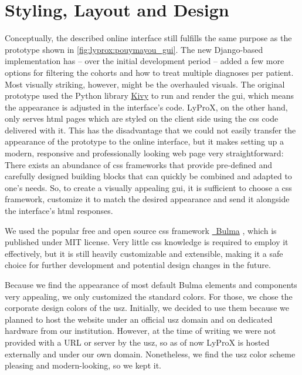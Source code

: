 \documentclass[\relativeRoot/main.tex]{subfiles}
\begin{document}
\section{Styling, Layout and Design}
\label{sec:lyprox:design}

Conceptually, the described online interface still fulfills the same purpose as the prototype shown in \cref{fig:lyprox:pouymayou_gui}. The new Django-based implementation has -- over the initial development period -- added a few more options for filtering the cohorts and how to treat multiple diagnoses per patient. Most visually striking, however, might be the overhauled visuals. The original prototype used the Python library \href{https://kivy.org}{Kivy} to run and render the \gls{gui}, which means the appearance is adjusted in the interface's code. LyProX, on the other hand, only serves \acrshort{html} pages which are styled on the client side using the \acrshort{css} code delivered with it. This has the disadvantage that we could not easily transfer the appearance of the prototype to the online interface, but it makes setting up a modern, responsive and professionally looking web page very straightforward: There exists an abundance of \acrshort{css} frameworks that provide pre-defined and carefully designed building blocks that can quickly be combined and adapted to one's needs. So, to create a visually appealing \gls{gui}, it is sufficient to choose a \acrshort{css} framework, customize it to match the desired appearance and send it alongside the interface's \acrshort{html} responses.

We used the popular free and open source \acrshort{css} framework \href{https://bulma.io}{~Bulma} \cite{thomas_bulma_2021}, which is published under MIT license. Very little \acrshort{css} knowledge is required to employ it effectively, but it is still heavily customizable and extensible, making it a safe choice for further development and potential design changes in the future.

Because we find the appearance of most default Bulma elements and components very appealing, we only customized the standard colors. For those, we chose the corporate design colors of the \gls{usz}. Initially, we decided to use them because we planned to host the website under an official \gls{usz} domain and on dedicated hardware from our institution. However, at the time of writing we were not provided with a URL or server by the \gls{usz}, so as of now LyProX is hosted externally and under our own domain. Nonetheless, we find the \gls{usz} color scheme pleasing and modern-looking, so we kept it.
\end{document}
